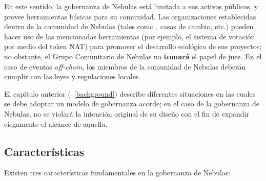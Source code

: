 En este sentido, la gobernanza de Nebulas está limitada a sus activos públicos, y provee herramientas básicas para su comunidad. Las organizaciones establecidas dentro de la comunidad de Nebulas (tales como \dapps, casas de cambio, etc.) pueden hacer uso de las mencionadas herramientas (por ejemplo, el sistema de votación \onchain por medio del token NAT) para promover el desarrollo ecológico de sus proyectos; no obstante, el Grupo Comunitario de Nebulas no \textbf{tomará} el papel de juez. En el caso de eventos \textit{off-chain}, los miembros de la comunidad de Nebulas deberán cumplir con las leyes y regulaciones locales.

El capítulo anterior (~\ref{background}) describe diferentes situaciones en las cuales se debe adoptar un modelo de gobernanza acorde; en el caso de la gobernanza de Nebulas, no se violará la intención original de su diseño con el fin de expandir ciegamente el alcance de aquella.

\subsection{Características}

Existen tres características fundamentales en la gobernanza de Nebulas:

